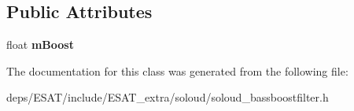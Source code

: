 \subsection*{Public Attributes}
\begin{DoxyCompactItemize}
\item 
\mbox{\label{class_so_loud_1_1_bassboost_filter_aad8ee489ea88a5fd2bf767205135a1f4}} 
float {\bfseries m\+Boost}
\end{DoxyCompactItemize}


The documentation for this class was generated from the following file\+:\begin{DoxyCompactItemize}
\item 
deps/\+E\+S\+A\+T/include/\+E\+S\+A\+T\+\_\+extra/soloud/soloud\+\_\+bassboostfilter.\+h\end{DoxyCompactItemize}

